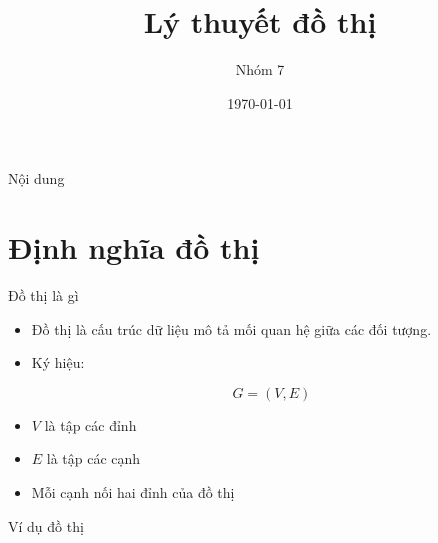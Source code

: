 \documentclass[aspectratio=169]{beamer}
\title{Lý thuyết đồ thị}
\author{Nhóm 7}
\date{\today}
\begin{document}
\begin{frame}
\titlepage
\end{frame}

\begin{frame}{Nội dung}
\tableofcontents
\end{frame}

\section{Định nghĩa đồ thị}

\begin{frame}{Đồ thị là gì}

\begin{itemize}

\item Đồ thị là cấu trúc dữ liệu mô tả mối quan hệ giữa các đối tượng.

\item Ký hiệu:

\[
G = (V,E)
\]

\item $V$ là tập các đỉnh

\item $E$ là tập các cạnh

\item Mỗi cạnh nối hai đỉnh của đồ thị

\end{itemize}

\end{frame}

\begin{frame}{Ví dụ đồ thị}

\begin{center}


\end{center}

\end{frame}
\end{document}
